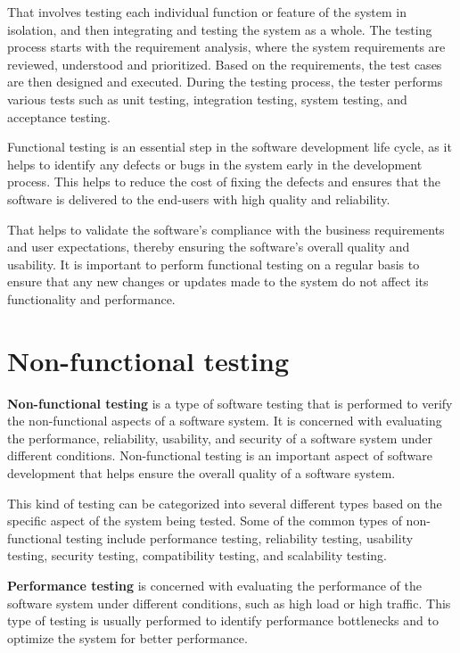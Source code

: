 That involves testing each individual function or feature of the system in isolation, and then 
integrating and testing the system as a whole. The testing process starts with the requirement analysis, 
where the system requirements are reviewed, understood and prioritized. Based on the requirements, 
the test cases are then designed and executed. During the testing process, the tester performs 
various tests such as unit testing, integration testing, system testing, and acceptance testing.

Functional testing is an essential step in the software development life cycle, as it helps to 
identify any defects or bugs in the system early in the development process. This helps to 
reduce the cost of fixing the defects and ensures that the software is delivered to the 
end-users with high quality and reliability.

That helps to validate the software's compliance with the business requirements 
and user expectations, thereby ensuring the software's overall quality and usability. 
It is important to perform functional testing on a regular basis to ensure that 
any new changes or updates made to the system do not affect its functionality and performance.


\section{Non-functional testing}
\textbf{Non-functional testing} is a type of software testing that is performed to verify the non-functional aspects of a software system. 
It is concerned with evaluating the performance, reliability, usability, and security of a software system under different conditions. 
Non-functional testing is an important aspect of software development that helps ensure the overall quality of a software system.

This kind of testing can be categorized into several different types based on the specific aspect of the system being tested. 
Some of the common types of non-functional testing include performance testing, reliability testing, usability testing, 
security testing, compatibility testing, and scalability testing.

\textbf{Performance testing} is concerned with evaluating the performance of the software system under different conditions, 
such as high load or high traffic. This type of testing is usually performed to identify performance bottlenecks and 
to optimize the system for better performance.

